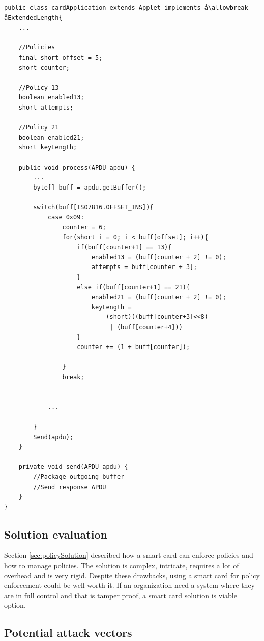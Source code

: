 \begin{lstlisting}[caption=Pseudo code for interpreting policy APDU with Java Card., label=lst:apduPolicy,escapechar=å]
public class cardApplication extends Applet implements å\allowbreak åExtendedLength{
    ...

    //Policies
    final short offset = 5;
    short counter;

    //Policy 13
    boolean enabled13;
    short attempts;

    //Policy 21
    boolean enabled21;
    short keyLength;

    public void process(APDU apdu) {
    	...
        byte[] buff = apdu.getBuffer();

    	switch(buff[ISO7816.OFFSET_INS]){
            case 0x09:
                counter = 6;
                for(short i = 0; i < buff[offset]; i++){
                    if(buff[counter+1] == 13){
                        enabled13 = (buff[counter + 2] != 0);
                        attempts = buff[counter + 3];
                    }
                    else if(buff[counter+1] == 21){
                        enabled21 = (buff[counter + 2] != 0);
                        keyLength =
                            (short)((buff[counter+3]<<8)
                             | (buff[counter+4]))
                    }
                    counter += (1 + buff[counter]);

                }
                break;


            ...

    	}
    	Send(apdu);
    }

    private void send(APDU apdu) {
    	//Package outgoing buffer
    	//Send response APDU
    }
}
\end{lstlisting}

\subsection{Solution evaluation}
Section \ref{sec:policySolution} described how a smart card can enforce policies and how to manage policies. The solution is complex, intricate, requires a lot of overhead and is very rigid. Despite these drawbacks, using a smart card for policy enforcement could be well worth it. If an organization need a system where they are in full control and that is tamper proof, a smart card solution is viable option.

\subsection{Potential attack vectors}
